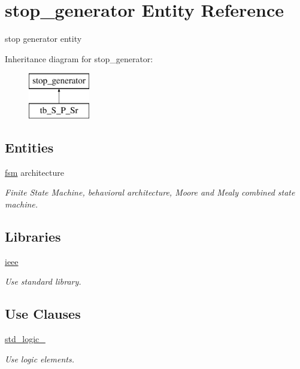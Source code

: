 \hypertarget{classstop__generator}{}\section{stop\+\_\+generator Entity Reference}
\label{classstop__generator}


stop generator entity  


Inheritance diagram for stop\+\_\+generator\+:\begin{figure}[H]
\begin{center}
\leavevmode
\includegraphics[height=2.000000cm]{classstop__generator}
\end{center}
\end{figure}
\subsection*{Entities}
\begin{DoxyCompactItemize}
\item 
\hyperlink{classstop__generator_1_1fsm}{fsm} architecture
\begin{DoxyCompactList}\small\item\em Finite State Machine, behavioral architecture, Moore and Mealy combined state machine. \end{DoxyCompactList}\end{DoxyCompactItemize}
\subsection*{Libraries}
 \begin{DoxyCompactItemize}
\item 
\hyperlink{classstop__generator_a0a6af6eef40212dbaf130d57ce711256}{ieee} 
\begin{DoxyCompactList}\small\item\em Use standard library. \end{DoxyCompactList}\end{DoxyCompactItemize}
\subsection*{Use Clauses}
 \begin{DoxyCompactItemize}
\item 
\hyperlink{classstop__generator_acd03516902501cd1c7296a98e22c6fcb}{std\+\_\+logic\+\_}   
\begin{DoxyCompactList}\small\item\em Use logic elements. \end{DoxyCompactList}\end{DoxyCompactItemize}
